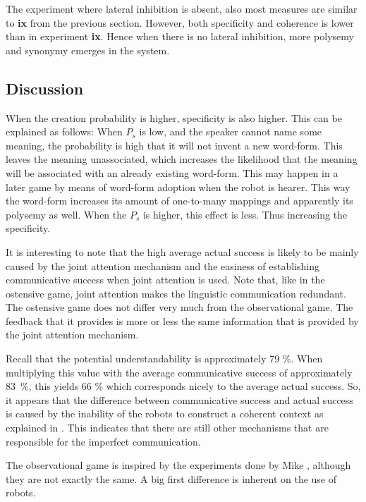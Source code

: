 The experiment where lateral inhibition is absent, also most measures are similar to {\bf ix} from the previous section. However, both specificity and coherence is lower than in experiment {\bf ix}. Hence when there is no lateral inhibition, more polysemy and synonymy emerges in the system.

\subsection{Discussion}

When the creation probability is higher, specificity is also higher. This can be explained as follows: When $P_s$ is low, and the speaker cannot name some meaning, the probability is high that it will not invent a new word-form. This leaves the meaning unassociated, which increases the likelihood that the meaning will be associated with an already existing word-form. This may happen in a later game by means of word-form adoption when the robot is hearer. This way the word-form increases its amount of one-to-many mappings and apparently its polysemy as well. When the $P_s$ is higher, this effect is less. Thus increasing the specificity.


It is interesting to note that the high average actual success is likely to be mainly caused by the joint attention mechanism and the easiness of establishing communicative success when joint attention is used. Note that, like in the ostensive game, joint attention makes the linguistic communication redundant. The ostensive game does not differ very much from the observational game. The feedback that it provides is more or less the same information that is provided by the joint attention mechanism.

Recall that the potential understandability is approximately 79 \%. When multiplying this value with the average communicative success of approximately 83~\%, this yields 66 \% which corresponds nicely to the average actual success. So, it appears that the difference between communicative success and actual success is caused by the inability of the robots to construct a coherent context as explained in . This indicates that there are still other mechanisms that are responsible for the imperfect communication.


The observational game is inspired by the experiments done by Mike \citet{oliphant:1997,oliphant:1998,oliphant:2000}, although they are not exactly the same. A big first difference is inherent on the use of robots. 

